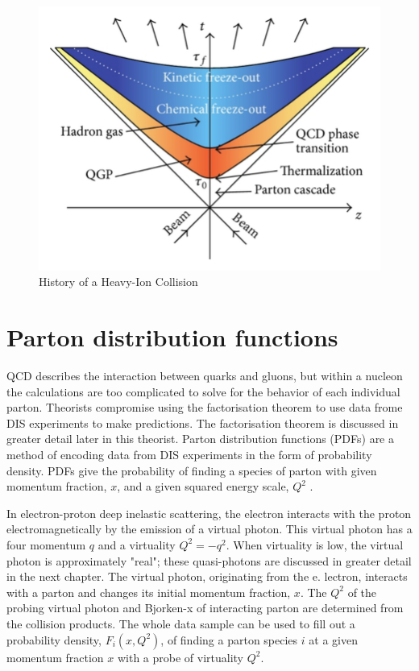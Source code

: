 \begin{figure}[h!]
\begin{centering}
\includegraphics[width=5in]{Chapter1/importfigs/The-space-time-evolution-of-heavy-ion-collision-The-figure-is-taken-from-28.png}
\par\end{centering}
\caption{History of a Heavy-Ion Collision \cite{Wang:2012jua}\label{fig:historyHI}}
\end{figure}

\section{Parton distribution functions}

QCD describes the interaction between quarks and gluons, but within a nucleon the calculations are too complicated to solve for the behavior of each individual parton. Theorists compromise using the factorisation theorem to use data frome DIS experiments to make predictions. The factorisation theorem is discussed in greater detail later in this theorist. Parton distribution functions (PDFs) are a method of encoding data from DIS experiments in the form of probability density. PDFs give the probability of finding a species of parton with given momentum fraction, $x$, and a given squared energy scale, $Q^2$ \cite{Martin:2009iq}.

In electron-proton deep inelastic scattering, the electron interacts with the proton electromagnetically by the emission of a virtual photon. This virtual photon has a four momentum $q$ and a virtuality $Q^2 = - q^2$. When virtuality is low, the virtual photon is approximately "real"; these quasi-photons are discussed in greater detail in the next chapter. The virtual photon, originating from the e. lectron, interacts with a parton and changes its initial momentum fraction, $x$. The $Q^2$ of the probing virtual photon and Bjorken-x of interacting parton are determined from the collision products. The whole data sample can be used to fill out a probability density, $F_i(x, Q^2)$, of finding a parton species $i$ at a given momentum fraction $x$ with a probe of virtuality $Q^2$.

